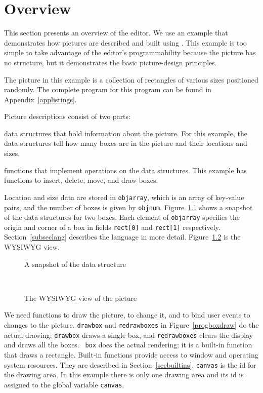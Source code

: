 \chapter{Overview}
\label{secoverview}
This section presents an overview of the editor. We use an example that
demonstrates how pictures are described and built using {\LEFTY}. This example
is too simple to take advantage of the editor's programmability because the
picture has no structure, but it demonstrates the basic picture-design
principles.

The picture in this example is a collection of rectangles of various sizes
positioned randomly. The complete program for this program can be found in
Appendix~\ref{applistings}.

Picture descriptions consist of two parts:
\begin{list}{}{}
\item[]
data structures that hold information about the picture. For this example, the
data structures tell how many boxes are in the picture and their locations and
sizes.
\item[]
functions that implement operations on the data structures. This example has
functions to insert, delete, move, and draw boxes.
\end{list}

\noindent
Location and size data are stored in {\tt objarray}, which is an array of
key-value pairs, and the number of boxes is given by {\tt objnum}.
Figure~\ref{progboxdsinitial} shows a snapshot of the data structures for two
boxes.  Each element of {\tt objarray} specifies the origin and corner of a box
in fields {\tt rect[0]} and {\tt rect[1]} respectively.
Section~\ref{subseclang} describes the {\LEFTY} language in more detail.
Figure~\ref{figboxinitial} is the WYSIWYG view.

\vspace{-6pt}
\begin{figure}[htb]

\vspace{-12pt}
\caption{A snapshot of the data structure}
\label{progboxdsinitial}
\end{figure}

\begin{figure}[htb]
\centerline{\hbox{
{\epsfxsize=2.5in }
}}
\caption{The WYSIWYG view of the picture}
\label{figboxinitial}
\end{figure}

We need functions to draw the picture, to change it, and to bind user events to
changes to the picture. {\tt drawbox} and {\tt redrawboxes} in
Figure~\ref{progboxdraw} do the actual drawing; {\tt drawbox} draws a single
box, and {\tt redrawboxes} clears the display and draws all the boxes. {\tt
box} does the actual rendering; it is a built-in function that draws a
rectangle.  Built-in functions provide access to window and operating system
resources.  They are described in Section~\ref{secbuiltins}. {\tt canvas} is
the id for the drawing area. In this example there is only one drawing area and
its id is assigned to the global variable {\tt canvas}.

